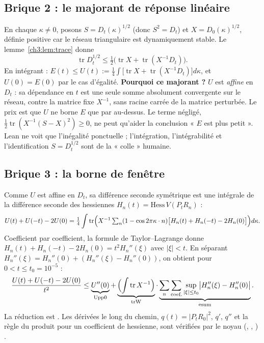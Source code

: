 \subsection{Brique 2 : le majorant de réponse linéaire \tierC}\label{ch3:sec:majorant}
En chaque $\kappa\ne0$, posons $S=D_t(\kappa)^{1/2}$ (donc $S^2=D_t$) et $X=D_0(\kappa)^{1/2}$, définie positive car le
réseau triangulaire est dynamiquement stable. Le lemme~\ref{ch3:lem:trace} donne
\[
\operatorname{tr}D_t^{1/2}\le\tfrac12\bigl(\operatorname{tr}X+\operatorname{tr}(X^{-1}D_t)\bigr).
\]
En intégrant : $E(t)\le U(t):=\tfrac14\int\bigl[\operatorname{tr}X+\operatorname{tr}(X^{-1}D_t)\bigr]d\kappa$, et
$U(0)=E(0)$ par le cas d'égalité. \textbf{Pourquoi ce majorant ?} $U$ est \emph{affine} en $D_t$ : sa dépendance en $t$
est une seule somme absolument convergente sur le réseau, contre la matrice fixe $X^{-1}$, sans racine carrée de la
matrice perturbée. Le prix est que $U$ ne borne $E$ que par au-dessus. Le terme négligé,
$\tfrac12\operatorname{tr}(X^{-1}(S-X)^2)\ge0$, ne peut qu'aider la conclusion « $E$ est plus petit ». Lean ne voit que
l'inégalité ponctuelle ; l'intégration, l'intégrabilité et l'identification $S=D_t^{1/2}$ sont de la « colle » humaine.

\subsection{Brique 3 : la borne de fenêtre}\label{ch3:sec:fenetre}
Comme $U$ est affine en $D_t$, sa différence seconde symétrique est une intégrale de la différence seconde des hessiennes
$H_n(t)=\mathrm{Hess}\,V(P_tR_n)$ :
\[
U(t)+U(-t)-2U(0)=\tfrac14\int\operatorname{tr}\Bigl(X^{-1}\textstyle\sum_n(1-\cos2\pi\kappa\cdot n)\bigl[H_n(t)+H_n(-t)-2H_n(0)\bigr]\Bigr)d\kappa .
\]
Coefficient par coefficient, la formule de Taylor--Lagrange donne $H_n(t)+H_n(-t)-2H_n(0)=t^2H_n''(\xi)$ avec
$|\xi|<t$. En séparant $H_n''(\xi)=H_n''(0)+(H_n''(\xi)-H_n''(0))$, on obtient pour $0<t\le t_0=10^{-5}$ :
\begin{equation}\label{ch3:eq:fenetre}
\frac{U(t)+U(-t)-2U(0)}{t^2}\le\underbrace{U''(0)}_{\mathrm{Upp0}}+\underbrace{\Bigl(\int\operatorname{tr}X^{-1}\Bigr)}_{\mathrm{trW}}\cdot
\underbrace{\sum_n\sum_{\text{coef.}}\sup_{|\xi|\le t_0}\bigl|H_n''(\xi)-H_n''(0)\bigr|}_{\mathrm{esum}} .
\end{equation}
La réduction est \tierC. Les dérivées le long du chemin, $q(t)=|P_tR_0|^2$, $q'$, $q''$ et la règle du produit pour
un coefficient de hessienne, sont vérifiées par le noyau (, ,
) \tierAs.

